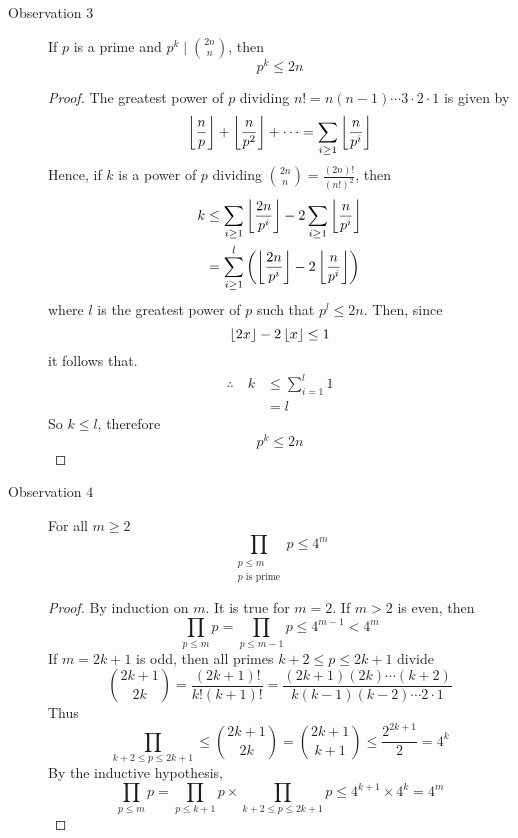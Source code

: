 \documentclass{article}
\begin{document}
\begin{description}
    \item[Observation $3$] If $p$ is a prime and $p^k \mid \binom{2n}{n}$, then
    \[
        p^k \leq 2n \tag{3}    
    \]
    \begin{proof}
        The greatest power of $p$ dividing $n! = n(n-1) \cdots 3 \cdot 2 \cdot 1$ is given by
        \[
            \left\lfloor \frac{n}{p} \right\rfloor + \left\lfloor \frac{n}{p^2} \right\rfloor + \cdots = \sum_{i \geq 1} \left\lfloor \frac{n}{p^i} \right\rfloor
        \]
        Hence, if $k$ is a power of $p$ dividing $\binom{2n}{n} = \frac{(2n)!}{(n!)^2}$, then
        \begin{align*}
            k &\leq \sum_{i \geq 1} \left\lfloor \frac{2n}{p^i} \right\rfloor - 2\sum_{i \geq 1} \left\lfloor \frac{n}{p^i} \right\rfloor \\
            &= \sum_{i \geq 1}^{l} \left( \left\lfloor \frac{2n}{p^i} \right\rfloor - 2\left\lfloor \frac{n}{p^i} \right\rfloor \right)
        \end{align*}
        where $l$ is the greatest power of $p$ such that $p^l \leq 2n$. Then, since
        \[
            \left\lfloor 2x \right\rfloor - 2 \left\lfloor x \right\rfloor \leq 1  
        \]
        it follows that.
        \begin{align*}
            \therefore \quad k &\leq \sum_{i = 1}^{l} 1 \\
            &= l
        \end{align*}
        So $k \leq l$, therefore
        \[
            p^k \leq 2n  
        \]
    \end{proof}

    \item[Observation $4$] For all $m \geq 2$
    \[
        \prod_{\substack{
            p \leq m \\
            p \text{ is prime}
        }} p \leq 4^m
    \]
    \begin{proof}
        By induction on $m$.
        It is true for $m = 2$.
        If $m > 2$ is even, then
        \[
            \prod_{p \leq m} p = \prod_{p \leq m - 1} p  \leq 4^{m - 1} < 4^m  
        \]
        If $m = 2k + 1$ is odd, then all primes $k + 2 \leq p \leq 2k + 1$ divide 
        \[
            \binom{2k + 1}{2k} = \frac{(2k + 1)!}{k!(k+1)!} = \frac{(2k + 1)(2k) \cdots (k + 2)}{k(k-1)(k-2)\cdots 2 \cdot 1}
        \]
        Thus
        \[
            \prod_{k + 2 \leq p \leq 2k + 1} \leq \binom{2k + 1}{2k} = \binom{2k +1}{k + 1} \leq \frac{2^{2k + 1}}{2} = 4^k 
        \]
        By the inductive hypothesis,
        \[
            \prod_{p \leq m} p = \prod_{p \leq k + 1} p \times \prod_{k + 2 \leq p \leq 2k + 1} p \leq 4^{k + 1} \times 4^k = 4^{m}
        \]
    \end{proof}
\end{description}
\end{document}
